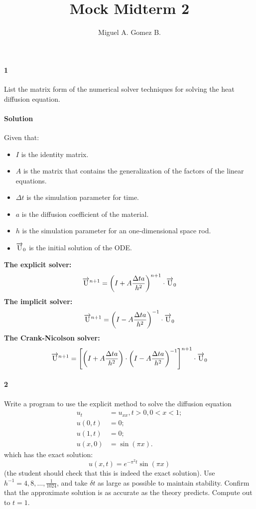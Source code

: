 \documentclass{article}
\title{Mock Midterm	2}
\author{Miguel A. Gomez B.}
\begin{document}
	\maketitle
\paragraph{1} List the matrix form of the numerical solver techniques for solving the heat diffusion equation.
\paragraph{Solution}
Given that:
\begin{itemize}
	\item $I$ is the identity matrix.
	\item $A$ is the matrix that contains the generalization of the factors of the linear equations.
	\item $\Delta t$ is the simulation parameter for time.
	\item $a$ is the diffusion coefficient of the material.
	\item $h$ is the simulation parameter for an one-dimensional space rod.
	\item $\overrightarrow{\rm U}_0$ is the initial solution of the ODE.
\end{itemize}
\textbf{The explicit solver:}
$$ \overrightarrow{\rm U}^{n+1} = \left(I + A\frac{\Delta t a}{h^2}\right)^{n+1} \cdot \overrightarrow{\rm U}_0$$
\textbf{The implicit solver:}
$$\overrightarrow{\rm U}^{n+1} = \left(I - A\frac{\Delta t a}{h^2}\right)^{-1} \cdot \overrightarrow{\rm U}_{0}$$
\textbf{The Crank-Nicolson solver:}
$$\overrightarrow{\rm U}^{n+1} = \left[\left(I + A\frac{\Delta t a}{h^2}\right) \cdot \left(I - A \frac{\Delta t a}{h^2}\right)^{-1} \right]^{n+1} \cdot \overrightarrow{\rm U}_{0}$$
\paragraph{2} Write a program to use the explicit method to solve the diffusion equation
\begin{align*}
	u_t &= u_{xx}, t > 0, 0 < x < 1;\\
	u(0, t) &= 0; \\
	u(1, t) &= 0; \\
	u(x, 0) &= \sin{(\pi x)}.
\end{align*}
which has the exact solution:
$$u(x, t) = e^{-\pi^2 t} \sin{(\pi x)}$$
(the student should check that this is indeed the exact solution). Use $h^{-1} = 4, 8, \dots, \frac{1}{1024}$, and take $\delta t$ as large as possible to maintain stability. Confirm that the approximate solution is as accurate as the theory predicts. Compute out to $t = 1$.
\end{document}
